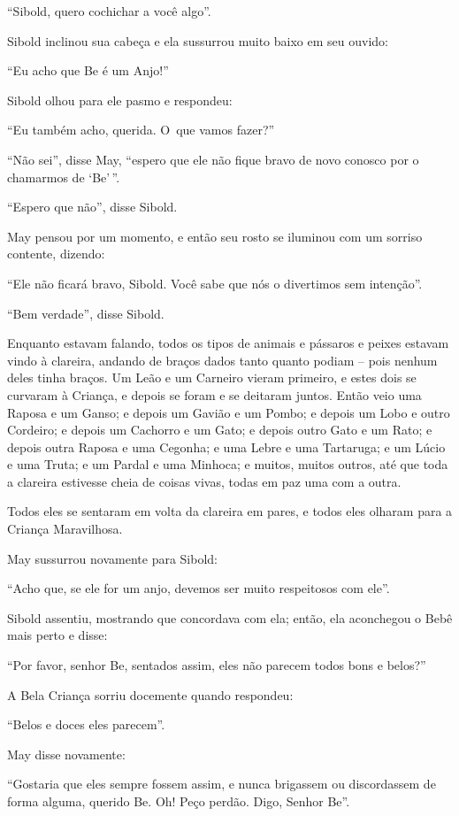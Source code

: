 ``Sibold, quero cochichar a você algo''.

Sibold inclinou sua cabeça e ela sussurrou muito baixo em seu ouvido:

``Eu acho que Be é um Anjo!''

Sibold olhou para ele pasmo e respondeu:

``Eu também acho, querida. O~que vamos fazer?''

``Não sei'', disse May, ``espero que ele não fique bravo de novo conosco
por o chamarmos de `Be'\,''.

``Espero que não'', disse Sibold.

May pensou por um momento, e então seu rosto se iluminou com um sorriso
contente, dizendo:

``Ele não ficará bravo, Sibold. Você sabe que nós o divertimos sem
intenção''.

``Bem verdade'', disse Sibold.

Enquanto estavam falando, todos os tipos de animais e pássaros e peixes
estavam vindo à clareira, andando de braços dados tanto quanto podiam --
pois nenhum deles tinha braços. Um Leão e um Carneiro vieram primeiro, e
estes dois se curvaram à Criança, e depois se foram e se deitaram
juntos. Então veio uma Raposa e um Ganso; e depois um Gavião e um Pombo;
e depois um Lobo e outro Cordeiro; e depois um Cachorro e um Gato; e
depois outro Gato e um Rato; e depois outra Raposa e uma Cegonha; e uma
Lebre e uma Tartaruga; e um Lúcio e uma Truta; e um Pardal e uma
Minhoca; e muitos, muitos outros, até que toda a clareira estivesse
cheia de coisas vivas, todas em paz uma com a outra.

Todos eles se sentaram em volta da clareira em pares, e todos eles
olharam para a Criança Maravilhosa.

May sussurrou novamente para Sibold:

``Acho que, se ele for um anjo, devemos ser muito respeitosos com ele''.

Sibold assentiu, mostrando que concordava com ela; então, ela aconchegou
o Bebê mais perto e disse:

``Por favor, senhor Be, sentados assim, eles não parecem todos bons e
belos?''

A Bela Criança sorriu docemente quando respondeu:

``Belos e doces eles parecem''.

May disse novamente:

``Gostaria que eles sempre fossem assim, e nunca brigassem ou
discordassem de forma alguma, querido Be. Oh! Peço perdão. Digo, Senhor
Be''.

